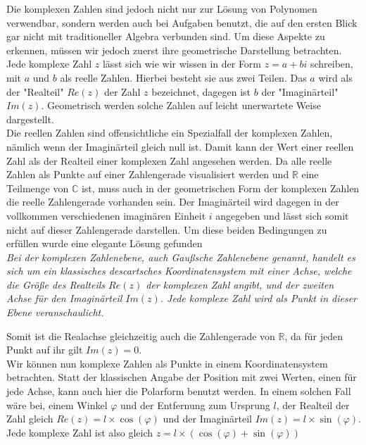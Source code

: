 \documentclass[a4paper,12pt]{article} %
\begin{document}
Die komplexen Zahlen sind jedoch nicht nur zur Lösung von Polynomen verwendbar, sondern werden auch bei Aufgaben benutzt, die auf den ersten Blick gar nicht mit traditioneller Algebra verbunden sind.
Um diese Aspekte zu erkennen, müssen wir jedoch zuerst ihre geometrische Darstellung betrachten.\\

Jede komplexe Zahl $z$ lässt sich wie wir wissen in der Form $z=a+bi$ schreiben, mit $a$ und $b$ als reelle Zahlen.
Hierbei besteht sie aus zwei Teilen.
Das $a$ wird als der "Realteil" $Re(z)$ der Zahl $z$ bezeichnet, dagegen ist $b$ der "{Imaginärteil}" $Im(z)$.
Geometrisch werden solche Zahlen auf leicht unerwartete Weise dargestellt.\\

Die reellen Zahlen sind offensichtliche ein Spezialfall der komplexen Zahlen, nämlich wenn der Imaginärteil gleich null ist.
Damit kann der Wert einer reellen Zahl als der Realteil einer komplexen Zahl angesehen werden.
Da alle reelle Zahlen als Punkte auf einer Zahlengerade visualisiert werden und $\mathbb{R}$ eine Teilmenge von $\mathbb{C}$ ist, muss auch in der geometrischen Form der komplexen Zahlen die reelle Zahlengerade vorhanden sein.
Der Imaginärteil wird dagegen in der vollkommen verschiedenen imaginären Einheit $i$ angegeben und lässt sich somit nicht auf dieser Zahlengerade darstellen.
Um diese beiden Bedingungen zu erfüllen wurde eine elegante Lösung gefunden\\


\emph{Bei der komplexen Zahlenebene, auch Gaußsche Zahlenebene genannt, handelt es sich um ein klassisches descartsches Koordinatensystem mit einer Achse, welche die Größe des Realteils $Re(z)$ der komplexen Zahl angibt, und der zweiten Achse für den Imaginärteil $Im(z)$. Jede komplexe Zahl wird als Punkt in dieser Ebene veranschaulicht.}

Somit ist die Realachse gleichzeitig auch die Zahlengerade von $\mathbb{R}$, da für jeden Punkt auf ihr gilt $Im(z)=0$.\\






 



Wir können nun komplexe Zahlen als Punkte in einem Koordinatensystem betrachten.
Statt der klassischen Angabe der Position mit zwei Werten, einen für jede Achse, kann auch hier die Polarform benutzt werden.
In einem solchen Fall wäre bei, einem Winkel $\varphi$ und der Entfernung zum Ursprung $l$, der Realteil der Zahl gleich $Re(z)=l\times\cos(\varphi)$ und der Imaginärteil $Im(z)=l\times\sin(\varphi)$.
Jede komplexe Zahl ist also gleich $z=l\times(\cos(\varphi)+\sin(\varphi))$
\end{document}

